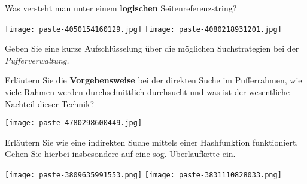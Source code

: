 \documentclass{article}
\begin{document}
\begin{tcolorbox}[colback=white!10!white,colframe=lightgray!75!black,
  savelowerto=\jobname_ex.tex,breakable,enhanced,lines before break=40]

\begin{center}
 Was versteht man unter einem 
\textbf{logischen
}Seitenreferenzstring? 

\end{center}

\tcblower

\justifying
\texttt{[image: paste-4050154160129.jpg]}
\texttt{[image: paste-4080218931201.jpg]}

\end{tcolorbox}
\begin{tcolorbox}[colback=white!10!white,colframe=lightgray!75!black,
  savelowerto=\jobname_ex.tex,breakable,enhanced,lines before break=40]

\begin{center}
 Geben Sie eine kurze Aufschlüsselung über die möglichen Suchstrategien bei der 
\textit{Pufferverwaltung.
} 

\end{center}

\tcblower

\justifying

\end{tcolorbox}
\begin{tcolorbox}[colback=white!10!white,colframe=lightgray!75!black,
  savelowerto=\jobname_ex.tex,breakable,enhanced,lines before break=40]

\begin{center}
 Erläutern Sie die 
\textbf{Vorgehensweise 
}bei der direkten Suche im Pufferrahmen, wie viele Rahmen werden durchschnittlich durchsucht und was ist der wesentliche Nachteil dieser Technik? 

\end{center}

\tcblower

\justifying
\texttt{[image: paste-4780298600449.jpg]}

\end{tcolorbox}
\begin{tcolorbox}[colback=white!10!white,colframe=lightgray!75!black,
  savelowerto=\jobname_ex.tex,breakable,enhanced,lines before break=40]

\begin{center}
 Erläutern Sie wie eine indirekten Suche mittels einer Hashfunktion funktioniert. Gehen Sie hierbei insbesondere auf eine sog. Überlaufkette ein. 

\end{center}

\tcblower

\justifying
\texttt{[image: paste-3809635991553.png]}
\texttt{[image: paste-3831110828033.png]}

\end{tcolorbox}
\end{document}
